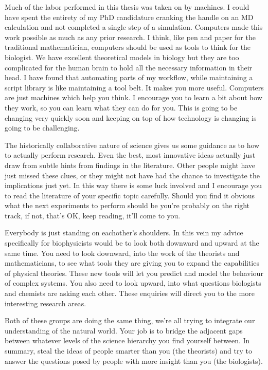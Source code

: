 Much of the labor performed in this thesis was taken on by machines. I could have spent the entirety of my PhD candidature cranking the handle on an MD calculation and not completed a single step of a simulation. Computers made this work possible as much as any prior research. I think, like pen and paper for the traditional mathematician, computers should be used as tools to think for the biologist. We have excellent theoretical models in biology but they are too complicated for the human brain to hold all the necessary information in their head. I have found that automating parts of my workflow, while maintaining a script library is like maintaining a tool belt. It makes you more useful. Computers are just machines which help you think. I encourage you to learn a bit about how they work, so you can learn what they can do for you. This is going to be changing very quickly soon and keeping on top of how technology is changing is going to be challenging. 

The historically collaborative nature of science gives us some guidance as to how to actually perform research. Even the best, most innovative ideas actually just draw from subtle hints from findings in the literature. Other people might have just missed these clues, or they might not have had the chance to investigate the implications just yet. In this way there is some luck involved and I encourage you to read the literature of your specific topic carefully. Should you find it obvious what the next experiments to perform should be you're probably on the right track, if not, that's OK, keep reading, it'll come to you.

Everybody is just standing on eachother's shoulders. In this vein my advice specifically for biophysicists would be to look both downward and upward at the same time. You need to look downward, into the work of the theorists and mathematicians, to see what tools they are giving you to expand the capabilities of physical theories. These new tools will let you predict and model the behaviour of complex systems. You also need to look upward, into what questions biologists and chemists are asking each other. These enquiries will direct you to the more interesting research areas. 

Both of these groups are doing the same thing, we're all trying to integrate our understanding of the natural world. Your job is to bridge the adjacent gaps between whatever levels of the science hierarchy you find yourself between. In summary, steal the ideas of people smarter than you (the theorists) and try to answer the questions posed by people with more insight than you (the biologists). 

